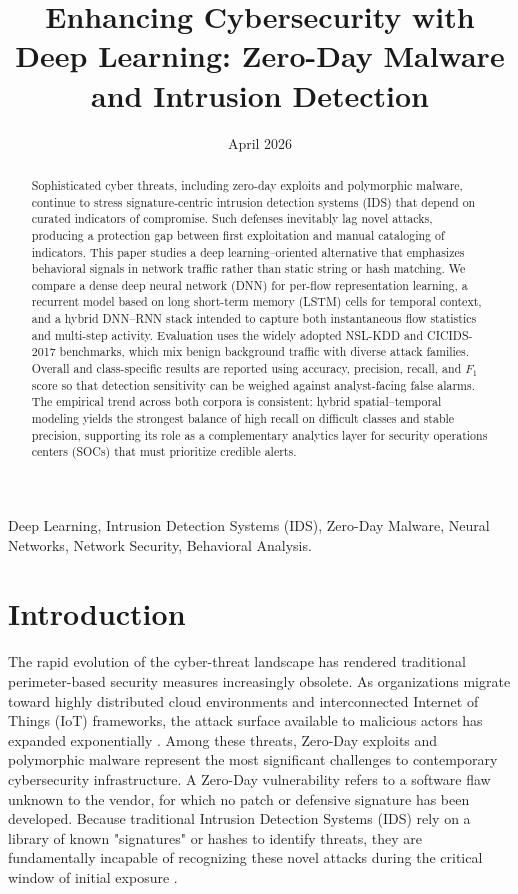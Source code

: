 \documentclass[10pt, conference, compsocconf, letterpaper, twocolumn, twoside]{IEEEtran}
\title{Enhancing Cybersecurity with Deep Learning: Zero-Day Malware and Intrusion Detection}
\author{
    \IEEEauthorblockN{Pranav Tej Lalapeta}
    \IEEEauthorblockA{Dept. of Computer Science\\
    University of Central Florida\\
    pr652213@ucf.edu}
    \and
    \IEEEauthorblockN{Sai Karthik Nallamothu}
    \IEEEauthorblockA{Dept. of Computer Science\\
    University of Central Florida\\
    sa808371@ucf.edu}
}
\date{April 2026}
\begin{document}
\maketitle

\begin{abstract}
Sophisticated cyber threats, including zero-day exploits and polymorphic malware, continue to stress signature-centric intrusion detection systems (IDS) that depend on curated indicators of compromise. Such defenses inevitably lag novel attacks, producing a protection gap between first exploitation and manual cataloging of indicators. This paper studies a deep learning--oriented alternative that emphasizes behavioral signals in network traffic rather than static string or hash matching. We compare a dense deep neural network (DNN) for per-flow representation learning, a recurrent model based on long short-term memory (LSTM) cells for temporal context, and a hybrid DNN--RNN stack intended to capture both instantaneous flow statistics and multi-step activity. Evaluation uses the widely adopted NSL-KDD and CICIDS-2017 benchmarks, which mix benign background traffic with diverse attack families. Overall and class-specific results are reported using accuracy, precision, recall, and $F_1$ score so that detection sensitivity can be weighed against analyst-facing false alarms. The empirical trend across both corpora is consistent: hybrid spatial--temporal modeling yields the strongest balance of high recall on difficult classes and stable precision, supporting its role as a complementary analytics layer for security operations centers (SOCs) that must prioritize credible alerts.
\end{abstract}

\begin{IEEEkeywords}
Deep Learning, Intrusion Detection Systems (IDS), Zero-Day Malware, Neural Networks, Network Security, Behavioral Analysis.
\end{IEEEkeywords}

\section{Introduction}
The rapid evolution of the cyber-threat landscape has rendered traditional perimeter-based security measures increasingly obsolete. As organizations migrate toward highly distributed cloud environments and interconnected Internet of Things (IoT) frameworks, the attack surface available to malicious actors has expanded exponentially \cite{buczak2016}. Among these threats, Zero-Day exploits and polymorphic malware represent the most significant challenges to contemporary cybersecurity infrastructure. A Zero-Day vulnerability refers to a software flaw unknown to the vendor, for which no patch or defensive signature has been developed. Because traditional Intrusion Detection Systems (IDS) rely on a library of known "signatures" or hashes to identify threats, they are fundamentally incapable of recognizing these novel attacks during the critical window of initial exposure \cite{denning1987}.
\end{document}
